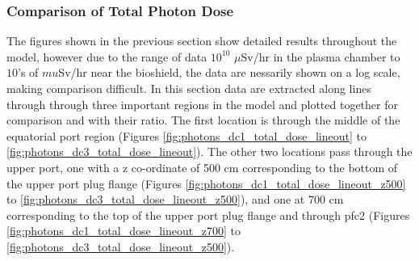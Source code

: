 \documentclass[12pt]{article}
\begin{document}
\newpage
\clearpage

\subsubsection{Comparison of Total Photon Dose}
The figures shown in the previous section show detailed results throughout the model, however due to the range of data
$10^{10}$ $\mu$Sv/hr in the plasma chamber to $10$'s of $mu$Sv/hr near the bioshield, the data are nessarily shown on a log scale, 
making comparison difficult. In this section data are extracted along lines through through three 
important regions in the model and plotted together for comparison and with their ratio.  The first location is through the 
middle of the equatorial port region (Figures \ref{fig:photons_dc1_total_dose_lineout}  to \ref{fig:photons_dc3_total_dose_lineout}).
The other two locations pass through the upper port, one with a z co-ordinate of 500 cm  corresponding to the bottom of the
upper port plug flange (Figures \ref{fig:photons_dc1_total_dose_lineout_z500} to \ref{fig:photons_dc3_total_dose_lineout_z500}),
and one at 700 cm corresponding to the top of the upper port plug flange and through \gls{pfc}2 
(Figures \ref{fig:photons_dc1_total_dose_lineout_z700} to \ref{fig:photons_dc3_total_dose_lineout_z500}).
\end{document}
